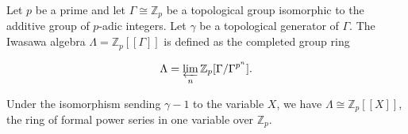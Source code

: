 Let $p$ be a prime and let $\Gamma \cong \mathbb{Z}_p$ be a topological group isomorphic to the additive group of $p$-adic integers. Let $\gamma$ be a topological generator of $\Gamma$. The Iwasawa algebra $\Lambda = \mathbb{Z}_p[[\Gamma]]$ is defined as the completed group ring

$$\Lambda = \varprojlim_n \mathbb{Z}_p[\Gamma/\Gamma^{p^n}].$$

Under the isomorphism sending $\gamma - 1$ to the variable $X$, we have $\Lambda \cong \mathbb{Z}_p[[X]]$, the ring of formal power series in one variable over $\mathbb{Z}_p$.
